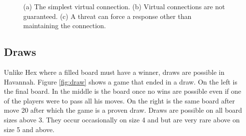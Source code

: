 \begin{figure}
  \centering


	\caption{(a) The simplest virtual connection. (b) Virtual connections are not guaranteed. (c) A threat can force a response other than maintaining the connection.}
	\label{fig:ringvc}
\end{figure}



\subsection{Draws}

Unlike Hex where a filled board must have a winner, draws are possible in Havannah. Figure \ref{fig:draw} shows a game that ended in a draw. On the left is the final board. In the middle is the board once no wins are possible even if one of the players were to pass all his moves. On the right is the same board after move 20 after which the game is a proven draw. Draws are possible on all board sizes above 3. They occur occasionally on size 4 and but are very rare above on size 5 and above.


